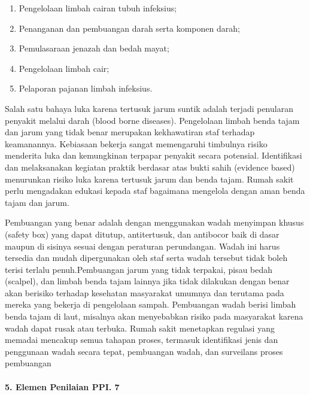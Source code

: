 \documentclass[
]{book}
\providecommand{\tightlist}{%
  \setlength{\itemsep}{0pt}\setlength{\parskip}{0pt}}
\begin{document}
\begin{enumerate}
\def\labelenumi{\alph{enumi}.}
\tightlist
\item
  Pengelolaan limbah cairan tubuh infeksius;
\item
  Penanganan dan pembuangan darah serta komponen darah;
\item
  Pemulasaraan jenazah dan bedah mayat;
\item
  Pengelolaan limbah cair;
\item
  Pelaporan pajanan limbah infeksius.
\end{enumerate}

Salah satu bahaya luka karena tertusuk jarum suntik adalah terjadi penularan penyakit melalui darah (blood borne diseases). Pengelolaan limbah benda tajam dan jarum yang tidak benar merupakan kekhawatiran staf terhadap keamanannya. Kebiasaan bekerja sangat memengaruhi timbulnya risiko menderita luka dan kemungkinan terpapar penyakit secara potensial. Identifikasi dan melaksanakan kegiatan praktik berdasar atas bukti sahih (evidence based) menurunkan risiko luka karena tertusuk jarum dan benda tajam. Rumah sakit perlu mengadakan edukasi kepada staf bagaimana mengelola dengan aman benda tajam dan jarum.

Pembuangan yang benar adalah dengan menggunakan wadah menyimpan khusus (safety box) yang dapat ditutup, antitertusuk, dan antibocor baik di dasar maupun di sisinya sesuai dengan peraturan perundangan. Wadah ini harus tersedia dan mudah dipergunakan oleh staf serta wadah tersebut tidak boleh terisi terlalu penuh.Pembuangan jarum yang tidak terpakai, pisau bedah (scalpel), dan limbah benda tajam lainnya jika tidak dilakukan dengan benar akan berisiko terhadap kesehatan masyarakat umumnya dan terutama pada mereka yang bekerja di pengelolaan sampah. Pembuangan wadah berisi limbah benda tajam di laut, misalnya akan menyebabkan risiko pada masyarakat karena wadah dapat rusak atau terbuka. Rumah sakit menetapkan regulasi yang memadai mencakup semua tahapan proses, termasuk identifikasi jenis dan penggunaan wadah secara tepat, pembuangan wadah, dan surveilans proses pembuangan

\hypertarget{elemen-penilaian-ppi.-7}{%
\paragraph*{5. Elemen Penilaian PPI. 7}\label{elemen-penilaian-ppi.-7}}
\end{document}

